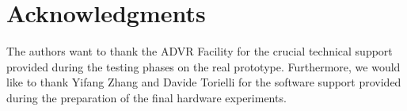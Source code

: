 \section*{Acknowledgments}
The authors want to thank the ADVR Facility for the crucial technical support provided during the testing phases on the real prototype. Furthermore, we would like to thank Yifang Zhang and Davide Torielli for the software support provided during the preparation of the final hardware experiments. 